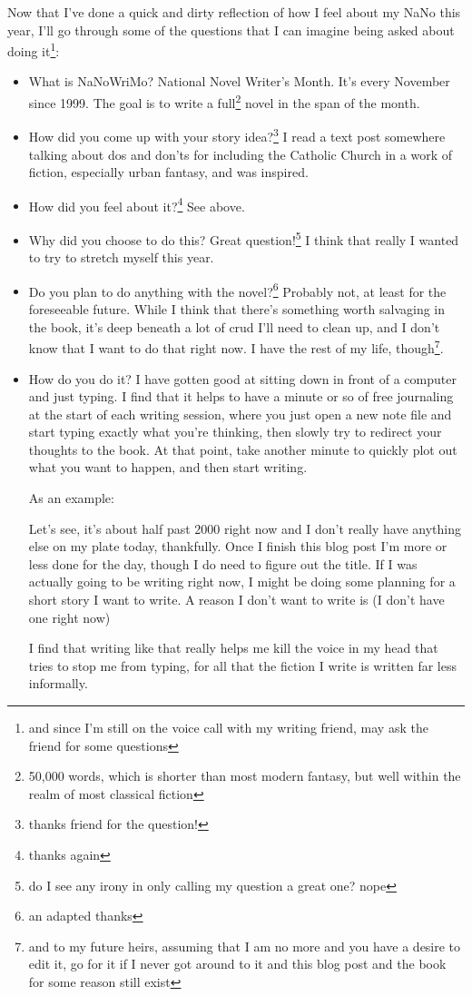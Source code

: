 \documentclass[12pt]{article}[titlepage]
\newcommand{\1}{\={a}}
\newcommand{\2}{\={e}}
\newcommand{\3}{\={\i}}
\newcommand{\4}{\=o}
\newcommand{\5}{\=u}
\newcommand{\6}{\={A}}
\renewcommand{\,}{\textsuperscript{,}}
\begin{document}
Now that I've done a quick and dirty reflection of how I feel about my NaNo this year, I'll go through some of the questions that I can imagine being asked about doing it\footnote{and since I'm still on the voice call with my writing friend, may ask the friend for some questions}:
\begin{itemize}
\item What is NaNoWriMo?
National Novel Writer's Month.
It's every November since 1999.
The goal is to write a full\footnote{50,000 words, which is shorter than most modern fantasy, but well within the realm of most classical fiction} novel in the span of the month. 
\item How did you come up with your story idea?\footnote{thanks friend for the question!}
I read a text post somewhere talking about dos and don'ts for including the Catholic Church in a work of fiction, especially urban fantasy, and was inspired.
\item How did you feel about it?\footnote{thanks again}
See above. 
\item Why did you choose to do this?
Great question!\footnote{do I see any irony in only calling my question a great one? nope} I think that really I wanted to try to stretch myself this year. 
\item Do you plan to do anything with the novel?\footnote{an adapted thanks}
Probably not, at least for the foreseeable future.
While I think that there's something worth salvaging in the book, it's deep beneath a lot of crud I'll need to clean up, and I don't know that I want to do that right now.
I have the rest of my life, though\footnote{and to my future heirs, assuming that I am no more and you have a desire to edit it, go for it if I never got around to it and this blog post and the book for some reason still exist}.
\item How do you do it?
I have gotten good at sitting down in front of a computer and just typing.
I find that it helps to have a minute or so of free journaling at the start of each writing session, where you just open a new note file and start typing exactly what you're thinking, then slowly try to redirect your thoughts to the book.
At that point, take another minute to quickly plot out what you want to happen, and then start writing.
 
As an example:
 
Let's see, it's about half past 2000 right now and I don't really have anything else on my plate today, thankfully.
Once I finish this blog post I'm more or less done for the day, though I do need to figure out the title.
If I was actually going to be writing right now, I might be doing some planning for a short story I want to write.
A reason I don't want to write is (I don't have one right now)
 
I find that writing like that really helps me kill the voice in my head that tries to stop me from typing, for all that the fiction I write is written far less informally.
\end{itemize}
 
\end{document}

